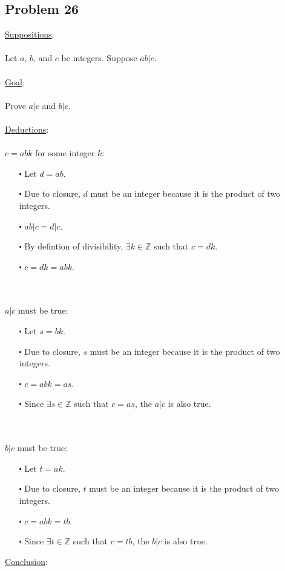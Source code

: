 \documentclass[12pt]{article}
\begin{document}
\subsection*{Problem 26}
\underline{Suppositions}:
\\ \\
Let $a$, $b$, and $c$ be integers. Suppose $ab|c$.
\\ \\
\underline{Goal}:
\\ \\
Prove $a|c$ and $b|c$.
\\ \\
\underline{Deductions}:
\\ \\
$c = abk$ for some integer $k$:
\begin{itemize}
  \item [$\centerdot$] Let $d = ab$. 
  \item [$\centerdot$] Due to closure, $d$ must be an integer because it is the product of two integers.
  \item [$\centerdot$] $ab|c = d|c$.
  \item [$\centerdot$] By defintion of divisibility, $\exists k \in \mathbb{Z}$ such that $c = dk$.
  \item [$\centerdot$] $c = dk = abk$.
\end{itemize}
\newblock
\\ \\
$a|c$ must be true:
\begin{itemize}
  \item [$\centerdot$] Let $s = bk$.
  \item [$\centerdot$] Due to closure, $s$ must be an integer because it is the product of two integers.
  \item [$\centerdot$] $c = abk = as$.
  \item [$\centerdot$] Since $\exists s \in \mathbb{Z}$ such that $c = as$, the $a|c$ is also true.
\end{itemize}
\newblock
\\ \\
$b|c$ must be true:
\begin{itemize}
  \item [$\centerdot$] Let $t = ak$.
  \item [$\centerdot$] Due to closure, $t$ must be an integer because it is the product of two integers.
  \item [$\centerdot$] $c = abk = tb$.
  \item [$\centerdot$] Since $\exists t \in \mathbb{Z}$ such that $c = tb$, the $b|c$ is also true.
\end{itemize}
\underline{Conclusion}:
\\ \\
\end{document}
